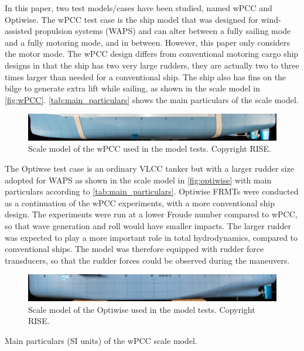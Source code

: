 \noindent In this paper, two test models/cases have been studied, named wPCC and Optiwise. The wPCC test case is the ship model that was designed for wind-assisted propulsion systems (WAPS) and can alter between a fully sailing mode and a fully motoring mode, and in between. 
However, this paper only considers the motor mode. The wPCC design differs from conventional motoring cargo ship designs in that the ship has two very large rudders, they are actually two to three times larger than needed for a conventional ship. The ship also has fins on the bilge to generate extra lift while sailing, as shown in the scale model in \autoref{fig:wPCC}.
\autoref{tab:main_particulars} shows the main particulars of the scale model. 

\begin{figure}[h]
    \centering
    \includegraphics[width=\columnwidth]{figures/5m2.jpg}
    \caption{Scale model of the wPCC used in the model tests. Copyright RISE.}
    \label{fig:wPCC}
\end{figure}

The Optiwse test case is an ordinary VLCC tanker but with a larger rudder size adopted for WAPS as shown in the scale model in \autoref{fig:optiwise} with main particulars according to \autoref{tab:main_particulars}.
Optiwise FRMTs were conducted as a continuation of the wPCC experiments, with a more conventional ship design. The experiments were run at a lower Froude number compared to wPCC, so that wave generation and roll would have smaller impacts. The larger rudder was expected to play a more important role in total hydrodynamics, compared to conventional ships. The model was therefore equipped with rudder force transducers, so that the rudder forces could be observed during the maneuvers. 
\begin{figure}[h]
    \centering
    \includegraphics[width=\columnwidth]{figures/optiwise.jpg}
    \caption{Scale model of the Optiwise used in the model tests. Copyright RISE.}
    \label{fig:optiwise}
\end{figure}
\begin{table}[h]
    \centering
    \scriptsize
    \caption{Main particulars (SI units) of the wPCC scale model.}
    \label{tab:main_particulars}
\end{table}